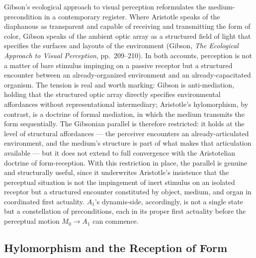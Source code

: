 Gibson's ecological approach to visual perception reformulates the medium-precondition in a contemporary register. Where Aristotle speaks of the diaphanous as transparent and capable of receiving and transmitting the form of color, Gibson speaks of the ambient optic array as a structured field of light that specifies the surfaces and layouts of the environment (Gibson, \textit{The Ecological Approach to Visual Perception}, pp.~209--210). In both accounts, perception is not a matter of bare stimulus impinging on a passive receptor but a structured encounter between an already-organized environment and an already-capacitated organism. The tension is real and worth marking: Gibson is anti-mediation, holding that the structured optic array directly specifies environmental affordances without representational intermediary; Aristotle's hylomorphism, by contrast, is a doctrine of formal mediation, in which the medium transmits the form sequentially. The Gibsonian parallel is therefore restricted: it holds at the level of structural affordances --- the perceiver encounters an already-articulated environment, and the medium's structure is part of what makes that articulation available --- but it does not extend to full convergence with the Aristotelian doctrine of form-reception. With this restriction in place, the parallel is genuine and structurally useful, since it underwrites Aristotle's insistence that the perceptual situation is not the impingement of inert stimulus on an isolated receptor but a structured encounter constituted by object, medium, and organ in coordinated first actuality. $A_1$'s dynamis-side, accordingly, is not a single state but a constellation of preconditions, each in its proper first actuality before the perceptual motion $M_0 \rightarrow A_1$ can commence.

\subsection{Hylomorphism and the Reception of Form}

